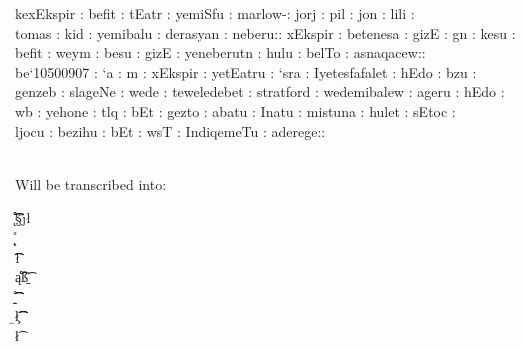 \noi
\parbox{5.0in}{
kexEkspir : befit : tEatr : yemiSfu : marlow-: jorj : pil : jon : lili :  \\
tomas : kid : yemibalu : derasyan : neberu:: xEkspir : betenesa : gizE : gn : kesu : \\
befit : weym : besu : gizE : yeneberutn : hulu : belTo : asnaqacew:: \\ 

be`10500907 : `a : m : xEkspir : yetEatru : `sra : Iyetesfafalet : hEdo : bzu : \\
genzeb : slageNe : wede : teweledebet : stratford : wedemibalew : ageru : hEdo : \\
wb : yehone : tlq : bEt : gezto : abatu : Inatu : mistuna : hulet : sEtoc : \\
ljocu : bezihu : bEt : wsT : IndiqemeTu : aderege:: \\ } \\ 

\noi
Will be transcribed into: \\

\noi
\parbox{5.0in}{
\ke\xE\k\s\pi\r \Gspace \be\Fi\t \Gspace \tE\ea\t\r \Gspace \ye\mi\S\fu \Gspace \ma\r\lo\w\Gcolon \jo\r\j \Gspace \pi\l \Gspace \jo\n \Gspace \li\li\Gspace  \\
\to\ma\s \Gspace \ki\d \Gspace \ye\mi\ba\lu \Gspace \de\ra\s\ya\n \Gspace \ne\be\ru\Gperiod \xE\k\s\pi\r \Gspace \be\te\ne\sa \Gspace \gi\zE \Gspace \g\n \Gspace \ke\su \Gspace  \\
\be\Fi\t \Gspace \we\y\m \Gspace \be\su \Gspace \gi\zE \Gspace \ye\ne\be\ru\t\n \Gspace \hu\lu \Gspace \be\l\To \Gspace \ea\s\na\qa\ce\w\Gperiod  \\

\noi
\be\asr\amst\meto\zeteN\sabat \Gspace \aa \Gspace \m \Gspace \xE\k\s\pi\r \Gspace \ye\tE\ea\t\ru \Gspace \ss\ra \Gspace \I\ye\te\s\fa\fa\le\t \Gspace \hE\ddo \Gspace \b\zu \Gspace \\
\ge\n\ze\b \Gspace \s\la\ge\Ne \Gspace \we\de \Gspace \te\we\le\de\be\t \Gspace \s\t\ra\t\fo\r\d \Gspace \we\de\mi\ba\le\w \Gspace \ea\ge\ru \Gspace \hE\ddo \Gspace \\
\w\b \Gspace \ye\ho\ne \Gspace \t\l\q \Gspace \bE\t \Gspace \ge\z\to \Gspace \ea\ba\tu \Gspace \I\na\tu \Gspace \mi\s\tu\na \Gspace \hu\le\t \Gspace \sE\to\c \Gspace \\
\l\jo\cu \Gspace \be\zi\hu \Gspace \bE\t \Gspace \w\s\T \Gspace \I\n\di\qe\me\Tu \Gspace \ea\de\re\ge\Gperiod} \\

